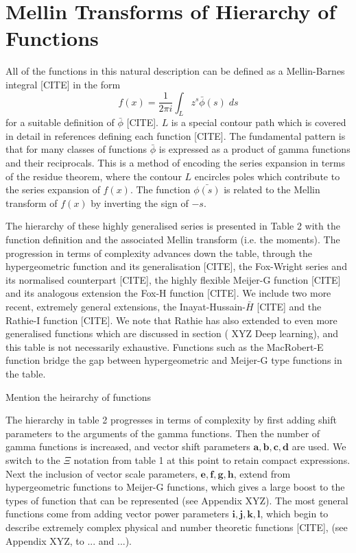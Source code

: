 \documentclass[journal=jcisd8,manuscript=article,layout=onecolumn,pdftex,floatfix,amsmath,amssymb,10pt]{achemso}
\begin{document}
\section{Mellin Transforms of Hierarchy of Functions}
All of the functions in this natural description can be defined as a Mellin-Barnes integral [CITE] in the form
\begin{equation}
f(x) = \frac{1}{2\pi i}\int_L z^s \bar{\phi}(s)\;ds
\end{equation}
for a suitable definition of $\bar{\phi}$ [CITE]. $L$ is a special contour path which is covered in detail in references defining each function [CITE]. The fundamental pattern is that for many classes of functions $\bar{\phi}$ is expressed as a product of gamma functions and their reciprocals. This is a method of encoding the series expansion in terms of the residue theorem, where the contour $L$ encircles poles which contribute to the series expansion of $f(x)$. The function $\bar{\phi(s)}$ is related to the Mellin transform of $f(x)$ by inverting the sign of $-s$. 

The hierarchy of these highly generalised series is presented in Table 2 with the function definition and the associated Mellin transform (i.e. the moments). The progression in terms of complexity advances down the table, through the hypergeometric function and its generalisation [CITE], the Fox-Wright series and its normalised counterpart [CITE], the highly flexible Meijer-G function [CITE] and its analogous extension the Fox-H function [CITE]. We include two more recent, extremely general extensions, the Inayat-Hussain-$\bar{H}$ [CITE] and the Rathie-I function [CITE]. We note that Rathie has also extended to even more generalised functions \citep{Rathie2013} which are discussed in section ({\color{red} XYZ Deep learning}), and this table is not necessarily exhaustive. Functions such as the MacRobert-E function bridge the gap between hypergeometric and Meijer-G  type functions in the table. 

{\color{red} Mention the heirarchy of functions}

The hierarchy in table 2 progresses in terms of complexity by first adding shift parameters to the arguments of the gamma functions. Then the number of gamma functions is increased, and vector shift parameters $\mathbf{a,b,c,d}$ are used. We switch to the $\Xi$ notation from table 1 at this point to retain compact expressions. Next the inclusion of vector scale parameters, $\mathbf{e,f,g,h}$, extend from hypergeometric functions to Meijer-G functions, which gives a large boost to the types of function that can be represented (see Appendix {\color{red}XYZ}). The most general functions come from adding vector power parameters $\mathbf{i,j,k,l}$, which begin to describe extremely complex physical and number theoretic functions [CITE], (see Appendix {\color{red}XYZ, to ... and ...}).
\end{document}
